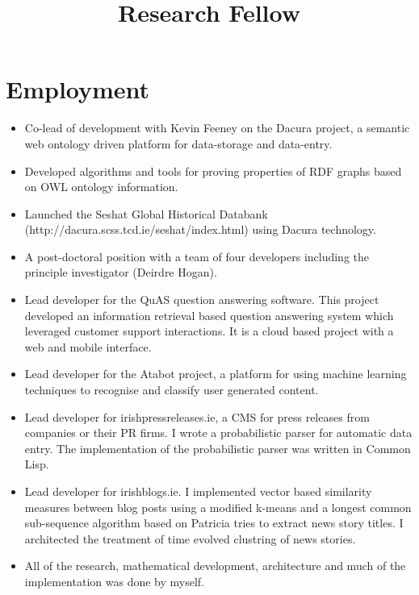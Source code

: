 \documentclass[a4paper,11pt]{moderncv}
\title{Research Fellow}
\begin{document}
\maketitle

\section{Employment}

{
  \begin{itemize}
  \item Co-lead of development with Kevin Feeney on the Dacura project, a semantic web ontology driven platform for data-storage and data-entry.
  \item Developed algorithms and tools for proving properties of RDF graphs based on OWL ontology information.
  \item Launched the Seshat Global Historical Databank (http://dacura.scss.tcd.ie/seshat/index.html) using Dacura technology.
  \end{itemize}
}

{
  \begin{itemize}
  \item A post-doctoral position with a team of four developers including the principle investigator (Deirdre Hogan).
  \item Lead developer for the QuAS question answering software. This project developed an information retrieval based question answering system which leveraged customer support interactions. It is a cloud based project with a web and mobile interface.
  \item Lead developer for the Atabot project, a platform for using machine learning techniques to recognise and classify user generated content.
  \end{itemize}
}

{
  \begin{itemize}
  \item Lead developer for irishpressreleases.ie, a CMS for press releases from companies or their PR firms. I wrote a probabilistic parser for automatic data entry. The implementation of the probabilistic parser was written in Common Lisp.
  \item Lead developer for irishblogs.ie. I implemented vector based similarity measures between blog posts using a modified k-means and a longest common sub-sequence algorithm based on Patricia tries to extract news story titles. I architected the treatment of time evolved clustring of news stories. 
  \item All of the research, mathematical development, architecture and much of the implementation was done by myself.
  \end{itemize}
}
\end{document}
